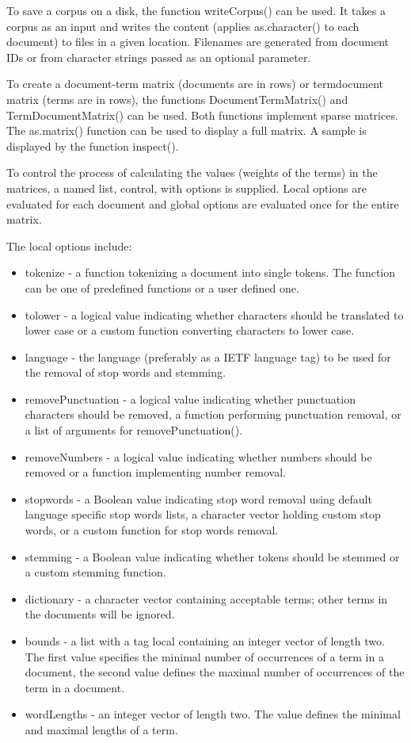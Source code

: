 \documentclass[11pt,openany,executivepaper]{book}
\begin{document}
To save a corpus on a disk, the function writeCorpus() can be used. It takes a corpus as an input and writes the content (applies as.character() to each document) to files in a given location. Filenames are generated from document IDs or from character strings passed as an optional parameter.

To create a document-term matrix (documents are in rows) or termdocument matrix (terms are in rows), the functions DocumentTermMatrix() and TermDocumentMatrix() can be used. Both functions implement sparse matrices. The as.matrix() function can be used to display a full matrix. A sample is displayed by the function inspect().

To control the process of calculating the values (weights of the terms) in the matrices, a named list, control, with options is supplied. Local options are evaluated for each document and global options are evaluated once for the entire matrix.

The local options include:

\begin{itemize}
  \item tokenize - a function tokenizing a document into single tokens. The function can be one of predefined functions or a user defined one.
  \item tolower - a logical value indicating whether characters should be translated to lower case or a custom function converting characters to lower case.
  \item language - the language (preferably as a IETF language tag) to be used for the removal of stop words and stemming.
  \item removePunctuation - a logical value indicating whether punctuation characters should be removed, a function performing punctuation removal, or a list of arguments for removePunctuation().
  \item removeNumbers - a logical value indicating whether numbers should be removed or a function implementing number removal.
  \item stopwords - a Boolean value indicating stop word removal using default language specific stop words lists, a character vector holding custom stop words, or a custom function for stop words removal.
  \item stemming - a Boolean value indicating whether tokens should be stemmed or a custom stemming function.
  \item dictionary - a character vector containing acceptable terms; other terms in the documents will be ignored.
  \item bounds - a list with a tag local containing an integer vector of length two. The first value specifies the minimal number of occurrences of a term in a document, the second value defines the maximal number of occurrences of the term in a document.
  \item wordLengths - an integer vector of length two. The value defines the minimal and maximal lengths of a term.
\end{itemize}
\end{document}
